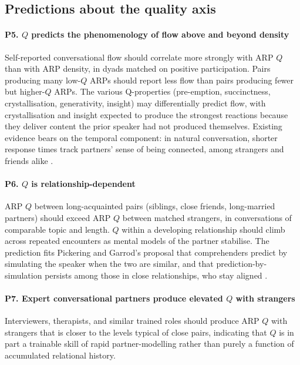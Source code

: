\subsection{Predictions about the quality axis}

\paragraph{P5. $Q$ predicts the phenomenology of flow above and beyond density} Self-reported conversational flow should correlate more strongly with ARP $Q$ than with ARP density, in dyads matched on positive participation. Pairs producing many low-$Q$ ARPs should report less flow than pairs producing fewer but higher-$Q$ ARPs. The various Q-properties (pre-emption, succinctness, crystallisation, generativity, insight) may differentially predict flow, with crystallisation and insight expected to produce the strongest reactions because they deliver content the prior speaker had not produced themselves. Existing evidence bears on the temporal component: in natural conversation, shorter response times track partners' sense of being connected, among strangers and friends alike \citep{Templeton2022}.

\paragraph{P6. $Q$ is relationship-dependent} ARP $Q$ between long-acquainted pairs (siblings, close friends, long-married partners) should exceed ARP $Q$ between matched strangers, in conversations of comparable topic and length. $Q$ within a developing relationship should climb across repeated encounters as mental models of the partner stabilise. The prediction fits Pickering and Garrod's proposal that comprehenders predict by simulating the speaker when the two are similar, and that prediction-by-simulation persists among those in close relationships, who stay aligned \citep[p.~346]{PickeringGarrod2013}.

\paragraph{P7. Expert conversational partners produce elevated $Q$ with strangers} Interviewers, therapists, and similar trained roles should produce ARP $Q$ with strangers that is closer to the levels typical of close pairs, indicating that $Q$ is in part a trainable skill of rapid partner-modelling rather than purely a function of accumulated relational history.

